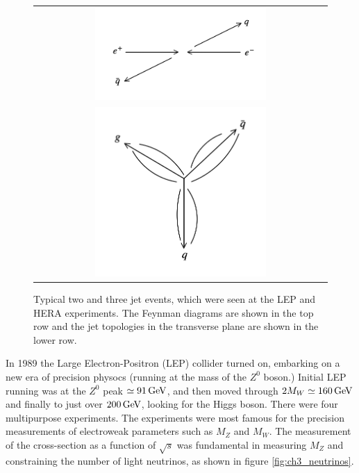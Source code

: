 \begin{figure}[!htb]
  \begin{center}
    \begin{tabular}{c}
      \includegraphics[width=0.6\textwidth]{images/web_feynman/image_14.png} \\
      \includegraphics[width=0.6\textwidth]{images/web_feynman/image_15.png}
    \end{tabular}
    \caption[Two and three jet events]{Typical two and three jet events, which were seen at the LEP and HERA experiments.  The Feynman diagrams are shown in the top row and the jet topologies in the transverse plane are shown in the lower row.}
    \label{fig:ch3_TwoJetVsThreeJet}
  \end{center}
\end{figure}

In 1989 the Large Electron-Positron (LEP) collider turned on, embarking on a new era of precision physocs (running at the mass of the $Z^0$ boson.)  Initial LEP running was at the $Z^0$ peak $\simeq 91\mathrm{\,GeV}$, and then moved through $2M_W \simeq 160\mathrm{\,GeV}$ and finally to just over $200 \mathrm{\,GeV}$, looking for the Higgs boson.  There were four multipurpose experiments.  The experiments were most famous for the precision measurements of electroweak parameters such as $M_Z$ and $M_W$.  The measurement of the cross-section as a function of $\sqrt{s}$ was fundamental in measuring $M_Z$ and constraining the number of light neutrinos, as shown in figure \ref{fig:ch3_neutrinos}.

